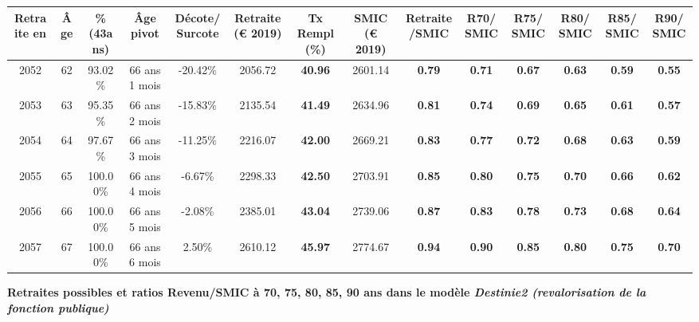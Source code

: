 \begin{adjustbox}{max width=\textwidth} 
\begin{tabular}[htb]{|c|c||c|c|c||c|c||c|c||c|c|c|c|c|} 
\hline 
 Retraite en &  Âge &  \%(43ans) &  Âge pivot &  Décote/Surcote &  Retraite (\euro{} 2019) &  Tx Rempl(\%) &  SMIC (\euro{} 2019) &  Retraite/SMIC &  R70/SMIC &  R75/SMIC &  R80/SMIC &  R85/SMIC &  R90/SMIC \\ 
\hline \hline 
 2052 &  62 &  93.02\% &  66 ans 1 mois &  -20.42\% &  2056.72 &  {\bf 40.96} &  2601.14 &  {\bf {\color{red} 0.79}} &  {\bf {\color{red} 0.71}} &  {\bf {\color{red} 0.67}} &  {\bf {\color{red} 0.63}} &  {\bf {\color{red} 0.59}} &  {\bf {\color{red} 0.55}} \\ 
\hline 
 2053 &  63 &  95.35\% &  66 ans 2 mois &  -15.83\% &  2135.54 &  {\bf 41.49} &  2634.96 &  {\bf {\color{red} 0.81}} &  {\bf {\color{red} 0.74}} &  {\bf {\color{red} 0.69}} &  {\bf {\color{red} 0.65}} &  {\bf {\color{red} 0.61}} &  {\bf {\color{red} 0.57}} \\ 
\hline 
 2054 &  64 &  97.67\% &  66 ans 3 mois &  -11.25\% &  2216.07 &  {\bf 42.00} &  2669.21 &  {\bf {\color{red} 0.83}} &  {\bf {\color{red} 0.77}} &  {\bf {\color{red} 0.72}} &  {\bf {\color{red} 0.68}} &  {\bf {\color{red} 0.63}} &  {\bf {\color{red} 0.59}} \\ 
\hline 
 2055 &  65 &  100.00\% &  66 ans 4 mois &  -6.67\% &  2298.33 &  {\bf 42.50} &  2703.91 &  {\bf {\color{red} 0.85}} &  {\bf {\color{red} 0.80}} &  {\bf {\color{red} 0.75}} &  {\bf {\color{red} 0.70}} &  {\bf {\color{red} 0.66}} &  {\bf {\color{red} 0.62}} \\ 
\hline 
 2056 &  66 &  100.00\% &  66 ans 5 mois &  -2.08\% &  2385.01 &  {\bf 43.04} &  2739.06 &  {\bf {\color{red} 0.87}} &  {\bf {\color{red} 0.83}} &  {\bf {\color{red} 0.78}} &  {\bf {\color{red} 0.73}} &  {\bf {\color{red} 0.68}} &  {\bf {\color{red} 0.64}} \\ 
\hline 
 2057 &  67 &  100.00\% &  66 ans 6 mois &  2.50\% &  2610.12 &  {\bf 45.97} &  2774.67 &  {\bf {\color{red} 0.94}} &  {\bf {\color{red} 0.90}} &  {\bf {\color{red} 0.85}} &  {\bf {\color{red} 0.80}} &  {\bf {\color{red} 0.75}} &  {\bf {\color{red} 0.70}} \\ 
\hline 
\hline 
\end{tabular} 
\end{adjustbox} 
 
 \vspace{0.1cm} 
{\bf \noindent Retraites possibles et ratios Revenu/SMIC à 70, 75, 80, 85, 90 ans dans le modèle \emph{Destinie2 (revalorisation de la fonction publique)}}  
 
